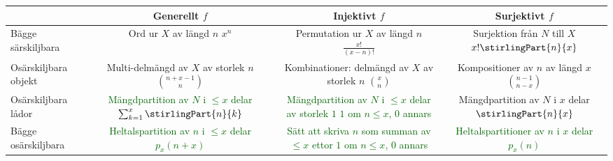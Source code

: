 \documentclass[nobib]{tufte-handout}
\begin{document}
\begin{fullwidth}
  \begin{tabularx}{\linewidth}{l|ccc}
      & Generellt $f$ & Injektivt $f$ & Surjektivt $f$\\
      \midrule
    Bägge särskiljbara & \specialcell{Ord ur $X$ av längd $n$\\ $x^n$} & \specialcell{Permutation ur $X$ av längd $n$\\ $\frac{x!}{(x-n)!}$} & \specialcell{Surjektion från $N$ till $X$\\$x!\stirlingPart{n}{x}$} \\
    Osärskiljbara objekt & \specialcell{Multi-delmängd av $X$\\ av storlek $n$\\$\binom{n + x - 1}{n}$} & \specialcell{Kombinationer:\\delmängd av $X$ av storlek $n$\\$\binom{x}{n}$} & \specialcell{Kompositioner av $n$\\av längd $x$\\$\binom{n - 1}{n - x}$} \\
    Osärskiljbara lådor & \specialcell{\textcolor{darkgreen}{Mängdpartition av $N$}\\ \textcolor{darkgreen}{ i $\leq x$ delar} \\\textcolor{darkgreen}{$\sum_{k=1}^{x} \stirlingPart{n}{k}$}} & \specialcell{\textcolor{darkgreen}{Mängdpartition av $N$}\\ \textcolor{darkgreen}{i $\leq x$ delar av storlek $1$}\\\textcolor{darkgreen}{$1$ om $n \leq x$, $0$ annars}} & \specialcell{Mängdpartition av $N$\\i $x$ delar\\$\stirlingPart{n}{x}$} \\
    Bägge osärskiljbara & \specialcell{\textcolor{darkgreen}{Heltalspartition av $n$ i $\leq x$ delar}\\\textcolor{darkgreen}{$p_x(n + x)$}} & \specialcell{\textcolor{darkgreen}{Sätt att skriva $n$ som}\\\textcolor{darkgreen}{summan av $\leq x$ ettor}\\\textcolor{darkgreen}{$1$ om $n \leq x$, $0$ annars}} & \specialcell{\textcolor{darkgreen}{Heltalspartitioner av $n$}\\ \textcolor{darkgreen}{i $x$ delar} \\\textcolor{darkgreen}{$p_x(n)$}} 
  \end{tabularx}
\end{fullwidth}
\end{document}
